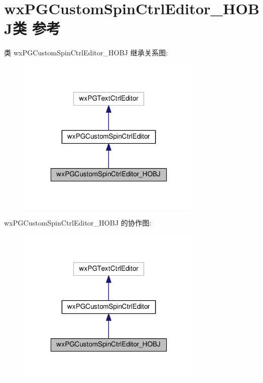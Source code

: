 \hypertarget{classwx_p_g_custom_spin_ctrl_editor___h_o_b_j}{\section{wx\+P\+G\+Custom\+Spin\+Ctrl\+Editor\+\_\+\+H\+O\+B\+J类 参考}
\label{classwx_p_g_custom_spin_ctrl_editor___h_o_b_j}
}


类 wx\+P\+G\+Custom\+Spin\+Ctrl\+Editor\+\_\+\+H\+O\+B\+J 继承关系图\+:
\nopagebreak
\begin{figure}[H]
\begin{center}
\leavevmode
\includegraphics[width=250pt]{classwx_p_g_custom_spin_ctrl_editor___h_o_b_j__inherit__graph}
\end{center}
\end{figure}


wx\+P\+G\+Custom\+Spin\+Ctrl\+Editor\+\_\+\+H\+O\+B\+J 的协作图\+:
\nopagebreak
\begin{figure}[H]
\begin{center}
\leavevmode
\includegraphics[width=250pt]{classwx_p_g_custom_spin_ctrl_editor___h_o_b_j__coll__graph}
\end{center}
\end{figure}
